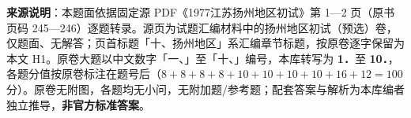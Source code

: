 


\begin{gktip}
\textbf{来源说明}：本题面依据固定源 PDF《1977江苏扬州地区初试》第 1—2 页（原书页码 245—246）逐题转录。源页为试题汇编材料中的扬州地区初试（预选）卷，仅题面、无解答；页首标题「十、扬州地区」系汇编章节标题，按原卷逐字保留为本文 H1。原卷大题以中文数字「一、」至「十、」编号，本库转写为 \textbf{1．}至 \textbf{10．}，各题分值按原卷标注在题号后（$8+8+8+8+10+10+10+10+16+12=100$ 分）。原卷无附图，各题均无小问，无附加题/参考题；配套答案与解析为本库编者独立推导，\textbf{非官方标准答案}。
\end{gktip}

\par\medskip

